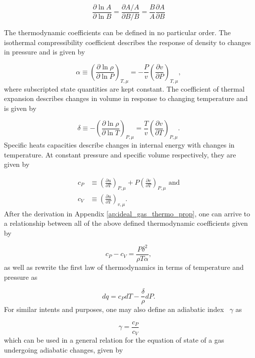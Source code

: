\documentclass[12pt]{article}
\newcommand{\pderiv}[2]{\frac{\partial #1}{\partial #2}}
\newcommand{\bigparenthesis}[1]{\left(#1\right)}
\begin{document}
\begin{equation}
    \pderiv{\ln A}{\ln B} = \frac{\partial A / A}{\partial B / B} = \frac{B}{A} \pderiv{A}{B}
\end{equation}

The thermodynamic coefficients can be defined in no particular order. The isothermal compressibility coefficient describes the response of density to changes in pressure and is given by

\begin{equation}
    \alpha \equiv \bigparenthesis{\pderiv{\ln\rho}{\ln P}}_{T,\mu} = -\frac{P}{v} \bigparenthesis{\pderiv{v}{P}}_{T,\mu},
\end{equation}
%
where subscripted state quantities are kept constant. The coefficient of thermal expansion describes changes in volume in response to changing temperature and is given by

\begin{equation}
    \delta \equiv -\bigparenthesis{\pderiv{\ln\rho}{\ln T}}_{P,\mu} = \frac{T}{v} \bigparenthesis{\pderiv{v}{T}}_{P,\mu}.
\end{equation}
%
Specific heats capacities describe changes in internal energy with changes in temperature. At constant pressure and specific volume respectively, they are given by

\begin{align}
    c_P &\equiv \bigparenthesis{\pderiv{u}{T}}_{P,\mu} + P\bigparenthesis{\pderiv{v}{T}}_{P,\mu}\text{ and}\\
    c_V &\equiv \bigparenthesis{\pderiv{u}{T}}_{v,\mu}.
\end{align}
%
After the derivation in Appendix \ref{ap:ideal_gas_thermo_prop}, one can arrive to a relationship between all of the above defined thermodynamic coefficients given by

\begin{equation}
    c_P - c_V = \frac{P \delta^2}{\rho T \alpha},
\end{equation}
%
as well as rewrite the first law of thermodynamics in terms of temperature and pressure as

\begin{equation}
    dq = c_P dT - \frac{\delta}{\rho} dP. \label{eq:first_law_TP}
\end{equation}
%
For similar intents and purposes, one may also define an adiabatic index~\cite{HK_book} $\gamma$ as

\begin{equation}
    \gamma = \frac{c_P}{c_V} 
\end{equation}
%
which can be used in a general relation for the equation of state of a gas undergoing adiabatic changes, given by 
\end{document}
